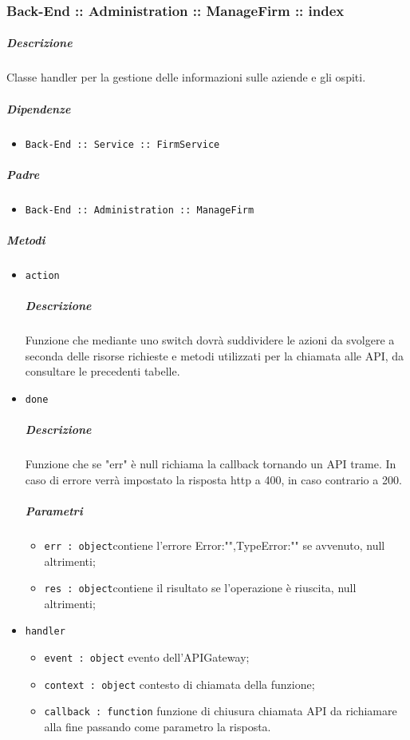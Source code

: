 \documentclass[../ManualeSviluppatore_v1.0.0.tex]{subfiles}
\begin{document}
\subsubsection{Back-End :: Administration :: ManageFirm :: index}
\subparagraph{Descrizione} Classe handler per la gestione delle informazioni sulle aziende e gli ospiti.
\subparagraph{Dipendenze}
\begin{itemize}
	\item \texttt{Back-End :: Service :: FirmService}
\end{itemize}
\subparagraph{Padre}
\begin{itemize}
	\item \texttt{Back-End :: Administration :: ManageFirm}
\end{itemize}
\subparagraph{Metodi}
\begin{itemize}
	\item \texttt{action}
	      \subparagraph{Descrizione} Funzione che mediante uno switch dovrà suddividere le azioni da svolgere a seconda delle risorse richieste e metodi utilizzati per la chiamata alle API, da consultare le precedenti tabelle.
	\item \texttt{done}
	      \subparagraph{Descrizione} Funzione che se "err" è null richiama la callback tornando un API trame. In caso di errore verrà impostato la risposta http a 400, in caso contrario a 200.
	      \subparagraph{Parametri}
	      \begin{itemize}
	      	\item \texttt{err : object}contiene l'errore {Error:"",TypeError:""} se avvenuto, null altrimenti;
	      	\item \texttt{res : object}contiene il risultato se l'operazione è riuscita, null altrimenti;
	      \end{itemize}
	\item \texttt{handler}
	      \begin{itemize}
	      	\item \texttt{event : object} evento dell'APIGateway;
	      	\item \texttt{context : object} contesto di chiamata della funzione;
	      	\item \texttt{callback : function} funzione di chiusura chiamata API da richiamare alla fine passando come parametro la risposta.
	      \end{itemize}
\end{itemize}
\end{document}
